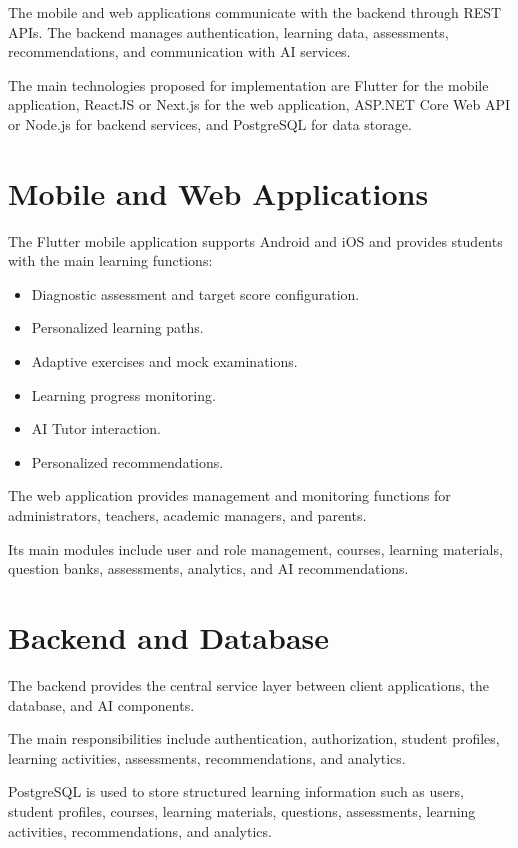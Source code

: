 \documentclass[12pt,a4paper]{report}
\begin{document}
The mobile and web applications communicate with the backend
through REST APIs. The backend manages authentication, learning
data, assessments, recommendations, and communication with AI
services.

The main technologies proposed for implementation are Flutter for
the mobile application, ReactJS or Next.js for the web application,
ASP.NET Core Web API or Node.js for backend services, and PostgreSQL
for data storage.


\section{Mobile and Web Applications}

The Flutter mobile application supports Android and iOS and provides
students with the main learning functions:

\begin{itemize}
	\item Diagnostic assessment and target score configuration.
	\item Personalized learning paths.
	\item Adaptive exercises and mock examinations.
	\item Learning progress monitoring.
	\item AI Tutor interaction.
	\item Personalized recommendations.
\end{itemize}

The web application provides management and monitoring functions for
administrators, teachers, academic managers, and parents.

Its main modules include user and role management, courses, learning
materials, question banks, assessments, analytics, and AI
recommendations.


\section{Backend and Database}

The backend provides the central service layer between client
applications, the database, and AI components.

The main responsibilities include authentication, authorization,
student profiles, learning activities, assessments, recommendations,
and analytics.

PostgreSQL is used to store structured learning information such as
users, student profiles, courses, learning materials, questions,
assessments, learning activities, recommendations, and analytics.
\end{document}
